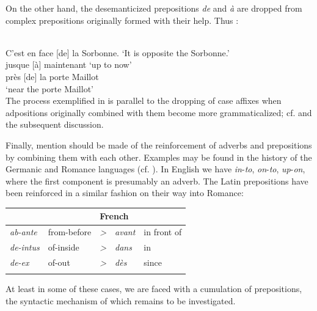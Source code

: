\noindent On the other hand, the desemanticized prepositions \textit{de} and \textit{à} are dropped from complex prepositions originally formed with their help. Thus \citep[123]{Frei1929}:

\ea\label{ex:E77}
\langinfo{\LangFren}{}{} \\
\ea  C'est en face [de] la Sorbonne.
\glt ‘It is opposite the Sorbonne.’\\
\ex  jusque [à] maintenant
\glt ‘up to now’\\
\ex  près [de] la porte Maillot\\
\glt ‘near the porte Maillot’\\
\z
\z
\noindent The process exemplified in  is parallel to the dropping of case affixes when adpositions originally combined with them become more grammaticalized; cf.  and the subsequent discussion.

Finally, mention should be made of the reinforcement of adverbs and prepositions by combining them with each other. Examples may be found in the history of the Germanic and Romance languages (cf. \citealt[41]{Kahr1975}). In English we have \textit{in}{}-\textit{to}, \textit{on}{}-\textit{to}, \textit{up}{}-\textit{on}, where the first component is presumably an adverb. The Latin prepositions have been reinforced in a similar fashion on their way into Romance:

\begin{table}
\begin{tabular}{lllll}
\lsptoprule
\multicolumn{2}{l}{Vulgar Latin} &  & \multicolumn{2}{l}{French}\\
\midrule
\itshape ab-ante & from-before & \itshape {\textgreater} & \itshape avant & in front of\\
\itshape de-intus & of-inside & \itshape {\textgreater} & \itshape dans & in\\
\itshape de-ex & of-out & \itshape {\textgreater} & \itshape d\`{e}s & since\\
\lspbottomrule
\end{tabular}
\end{table}

At least in some of these cases, we are faced with a cumulation of prepositions, the syntactic mechanism of which remains to be investigated.

